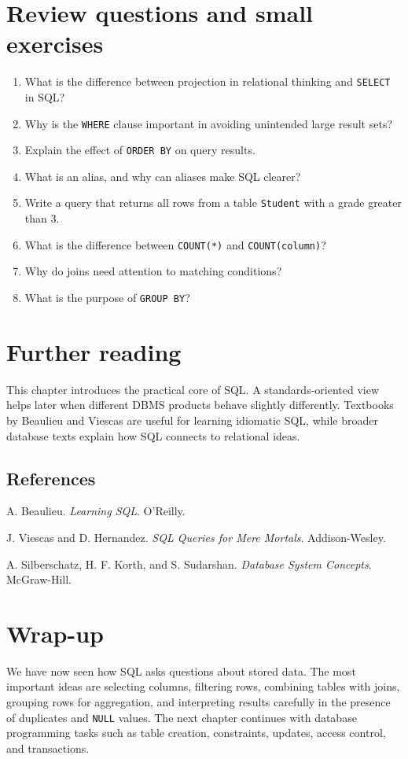 \documentclass[11pt,a4paper,openany]{book}
\makeatletter
\renewenvironment{thebibliography}[1]
 {\subsection*{References}%
  \list{\@biblabel{\@arabic\c@enumiv}}%
   {\settowidth\labelwidth{\@biblabel{#1}}%
    \leftmargin\labelwidth\advance\leftmargin\labelsep
    \usecounter{enumiv}\let\p@enumiv\@empty
    \renewcommand\theenumiv{\@arabic\c@enumiv}}%
  \sloppy\clubpenalty4000\widowpenalty4000}
 {\endlist}
\makeatother
\begin{document}
\section{Review questions and small exercises}
\begin{enumerate}
\item What is the difference between projection in relational thinking and \texttt{SELECT} in SQL?
\item Why is the \texttt{WHERE} clause important in avoiding unintended large result sets?
\item Explain the effect of \texttt{ORDER BY} on query results.
\item What is an alias, and why can aliases make SQL clearer?
\item Write a query that returns all rows from a table \texttt{Student} with a grade greater than 3.
\item What is the difference between \texttt{COUNT(*)} and \texttt{COUNT(column)}?
\item Why do joins need attention to matching conditions?
\item What is the purpose of \texttt{GROUP BY}?
\end{enumerate}

\section{Further reading}
This chapter introduces the practical core of SQL. A standards-oriented view helps later when different DBMS products behave slightly differently. Textbooks by Beaulieu and Viescas are useful for learning idiomatic SQL, while broader database texts explain how SQL connects to relational ideas.

\begin{thebibliography}{9}
A. Beaulieu.
\textit{Learning SQL}. O'Reilly.

J. Viescas and D. Hernandez.
\textit{SQL Queries for Mere Mortals}. Addison-Wesley.

A. Silberschatz, H. F. Korth, and S. Sudarshan.
\textit{Database System Concepts}. McGraw-Hill.
\end{thebibliography}

\section{Wrap-up}
We have now seen how SQL asks questions about stored data. The most important ideas are selecting columns, filtering rows, combining tables with joins, grouping rows for aggregation, and interpreting results carefully in the presence of duplicates and \texttt{NULL} values. The next chapter continues with database programming tasks such as table creation, constraints, updates, access control, and transactions.
\end{document}
